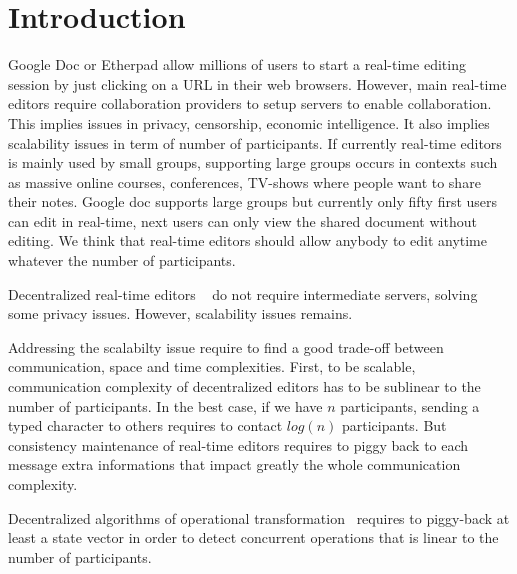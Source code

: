 
\section{Introduction}



Google Doc or Etherpad allow millions of users to start a real-time
editing session by just clicking on a URL in their web
browsers. However, main real-time editors require collaboration
providers to setup servers to enable collaboration. This implies
issues in privacy, censorship, economic intelligence. It also implies
scalability issues in term of number of participants. If currently
real-time editors is mainly used by small groups, supporting large
groups occurs in contexts such as massive online courses,
conferences, TV-shows where people want to share their notes. Google
doc supports large groups but currently only fifty first users can
edit in real-time, next users can only view the shared document
without editing. We think that real-time editors should allow anybody
to edit anytime whatever the number of participants.

Decentralized real-time editors ~\cite{oster2006data,
  sun1998operational, sun2009contextbased} do not require intermediate
servers, solving some privacy issues. However, scalability issues remains.
%

Addressing the scalabilty issue require to find a good trade-off
between communication, space and time complexities. First, to be
scalable, communication complexity of decentralized editors has to be
sublinear to the number of participants. In the best case, if we have
$n$ participants, sending a typed character to others requires to
contact $log(n)$ participants. But consistency maintenance of
real-time editors requires to piggy back to each message extra
informations that impact greatly the whole communication complexity.

Decentralized algorithms of operational
transformation~\cite{sun2009contextbased} requires to piggy-back at
least a state vector in order to detect concurrent operations that is
linear to the number of participants.

